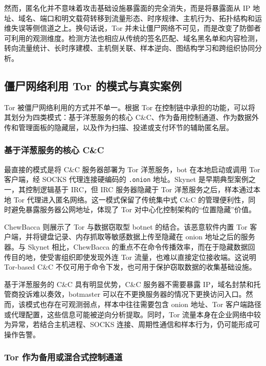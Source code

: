然而，匿名化并不意味着攻击基础设施暴露面的完全消失，而是将暴露面从 IP 地址、域名、端口和明文载荷转移到流量形态、时序规律、主机行为、拓扑结构和运维失误等侧信道之上\cite{casenove2014botnet}。换句话说，Tor 并未让僵尸网络不可见，而是改变了防御者可利用的观测维度。检测方法也相应从传统的签名匹配、域名黑名单和内容检测，转向流量统计、长时序建模、主机侧关联、样本逆向、图结构学习和跨组织协同分析。

\subsection{僵尸网络利用 Tor 的模式与真实案例}
\label{subsec:tor_botnet_cases}

Tor 被僵尸网络利用的方式并不单一。根据 Tor 在控制链中承担的功能，可以将其划分为四类模式：基于洋葱服务的核心 C\&C、作为备用控制通道、作为数据外传和管理面板的隐藏层，以及作为扫描、投递或支付环节的辅助匿名层。

\subsubsection{基于洋葱服务的核心 C\&C}

最直接的模式是将 C\&C 服务器部署为 Tor 洋葱服务，bot 在本地启动或调用 Tor 客户端，经 SOCKS 代理连接硬编码的 \texttt{.onion} 地址。Skynet 是早期典型案例之一，其控制逻辑基于 IRC，但 IRC 服务器隐藏于 Tor 洋葱服务之后，样本通过本地 Tor 代理进入匿名网络\cite{rapid7skynet}。这一模式保留了传统集中式 C\&C 的管理便利性，同时避免暴露服务器公网地址，体现了 Tor 对中心化控制架构的“位置隐藏”价值。

ChewBacca 则展示了 Tor 与数据窃取型 botnet 的结合。该恶意软件内置 Tor 客户端，并将键盘记录、内存抓取等敏感数据上传至隐藏在 onion 地址之后的服务器\cite{kaspersky2013chewbacca}。与 Skynet 相比，ChewBacca 的重点不在命令传播效率，而在于隐藏数据回传目的地，使受害组织即使发现外连 Tor 流量，也难以直接定位接收端。这说明 Tor-based C\&C 不仅可用于命令下发，也可用于保护窃取数据的收集基础设施。

基于洋葱服务的 C\&C 具有明显优势，C\&C 服务器不需要暴露 IP，域名封禁和托管商投诉难以奏效，botmaster 可以在不更换服务器的情况下更换访问入口。然而，该模式也存在可观测弱点，样本中往往需要包含 onion 地址、Tor 客户端路径或代理配置，这些信息可能被逆向分析提取。同时，Tor 流量本身在企业网络中较为异常，若结合主机进程、SOCKS 连接、周期性通信和样本行为，仍可能形成可操作告警。

\subsubsection{Tor 作为备用或混合式控制通道}


